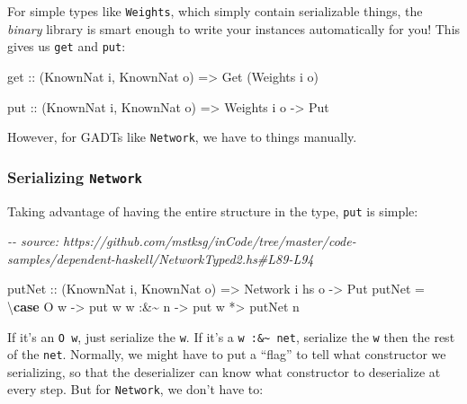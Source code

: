 \documentclass[]{article}
\newenvironment{Shaded}{}{}
\newcommand{\CommentTok}[1]{\textcolor[rgb]{0.38,0.63,0.69}{\textit{#1}}}
\newcommand{\DataTypeTok}[1]{\textcolor[rgb]{0.56,0.13,0.00}{#1}}
\newcommand{\KeywordTok}[1]{\textcolor[rgb]{0.00,0.44,0.13}{\textbf{#1}}}
\newcommand{\NormalTok}[1]{#1}
\newcommand{\OperatorTok}[1]{\textcolor[rgb]{0.40,0.40,0.40}{#1}}
\newcommand{\OtherTok}[1]{\textcolor[rgb]{0.00,0.44,0.13}{#1}}
\begin{document}
For simple types like \texttt{Weights}, which simply contain serializable
things, the \emph{binary} library is smart enough to write your instances
automatically for you! This gives us \texttt{get} and \texttt{put}:

\begin{Shaded}
\begin{Highlighting}[]
\OtherTok{get ::}\NormalTok{ (}\DataTypeTok{KnownNat}\NormalTok{ i, }\DataTypeTok{KnownNat}\NormalTok{ o)}
    \OtherTok{=\textgreater{}} \DataTypeTok{Get}\NormalTok{ (}\DataTypeTok{Weights}\NormalTok{ i o)}

\OtherTok{put ::}\NormalTok{ (}\DataTypeTok{KnownNat}\NormalTok{ i, }\DataTypeTok{KnownNat}\NormalTok{ o)}
    \OtherTok{=\textgreater{}} \DataTypeTok{Weights}\NormalTok{ i o}
    \OtherTok{{-}\textgreater{}} \DataTypeTok{Put}
\end{Highlighting}
\end{Shaded}

However, for GADTs like \texttt{Network}, we have to things manually.

\subsubsection{\texorpdfstring{Serializing
\texttt{Network}}{Serializing Network}}\label{serializing-network}

Taking advantage of having the entire structure in the type, \texttt{put} is
simple:

\begin{Shaded}
\begin{Highlighting}[]
\CommentTok{{-}{-} source: https://github.com/mstksg/inCode/tree/master/code{-}samples/dependent{-}haskell/NetworkTyped2.hs\#L89{-}L94}

\OtherTok{putNet ::}\NormalTok{ (}\DataTypeTok{KnownNat}\NormalTok{ i, }\DataTypeTok{KnownNat}\NormalTok{ o)}
       \OtherTok{=\textgreater{}} \DataTypeTok{Network}\NormalTok{ i hs o}
       \OtherTok{{-}\textgreater{}} \DataTypeTok{Put}
\NormalTok{putNet }\OtherTok{=}\NormalTok{ \textbackslash{}}\KeywordTok{case}
    \DataTypeTok{O}\NormalTok{ w     }\OtherTok{{-}\textgreater{}}\NormalTok{ put w}
\NormalTok{    w }\OperatorTok{:\&\textasciitilde{}}\NormalTok{ n }\OtherTok{{-}\textgreater{}}\NormalTok{ put w }\OperatorTok{*\textgreater{}}\NormalTok{ putNet n}
\end{Highlighting}
\end{Shaded}

If it's an \texttt{O\ w}, just serialize the \texttt{w}. If it's a
\texttt{w\ :\&\textasciitilde{}\ net}, serialize the \texttt{w} then the rest of
the \texttt{net}. Normally, we might have to put a ``flag'' to tell what
constructor we serializing, so that the deserializer can know what constructor
to deserialize at every step. But for \texttt{Network}, we don't have to:
\end{document}
